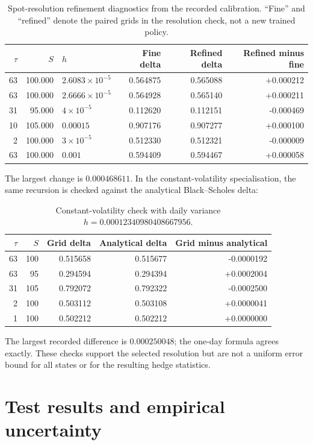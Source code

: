\documentclass[11pt,a4paper]{article}
\theoremstyle{remark}
\begin{document}
\begin{table}[htbp]
\centering\small
\caption{Spot-resolution refinement diagnostics from the recorded calibration. ``Fine'' and ``refined'' denote the paired grids in the resolution check, not a new trained policy.}
\label{tab:refinement}
\begin{tabular}{@{}rrlrrr@{}}
\toprule
$\tau$ & $S$ & $h$ & Fine delta & Refined delta & Refined minus fine\\
\midrule
63 & 100.000 & $2.6083\times 10^{-5}$ & 0.564875 & 0.565088 & +0.000212 \\
63 & 100.000 & $2.6666\times 10^{-5}$ & 0.564928 & 0.565140 & +0.000211 \\
31 & 95.000 & $4\times 10^{-5}$ & 0.112620 & 0.112151 & -0.000469 \\
10 & 105.000 & $0.00015$ & 0.907176 & 0.907277 & +0.000100 \\
2 & 100.000 & $3\times 10^{-5}$ & 0.512330 & 0.512321 & -0.000009 \\
63 & 100.000 & $0.001$ & 0.594409 & 0.594467 & +0.000058 \\
\bottomrule
\end{tabular}
\end{table}
The largest change is $0.000468611$. In the constant-volatility specialisation, the same recursion is checked against the analytical Black--Scholes delta:
\begin{table}[htbp]
\centering\small
\caption{Constant-volatility check with daily variance $h=0.00012340980408667956$.}
\begin{tabular}{@{}rrrrr@{}}
\toprule
$\tau$ & $S$ & Grid delta & Analytical delta & Grid minus analytical\\
\midrule
63 & 100 & 0.515658 & 0.515677 & -0.0000192 \\
63 & 95 & 0.294594 & 0.294394 & +0.0002004 \\
31 & 105 & 0.792072 & 0.792322 & -0.0002500 \\
2 & 100 & 0.503112 & 0.503108 & +0.0000041 \\
1 & 100 & 0.502212 & 0.502212 & +0.0000000 \\
\bottomrule
\end{tabular}
\end{table}
The largest recorded difference is $0.000250048$; the one-day formula agrees exactly. These checks support the selected resolution but are not a uniform error bound for all states or for the resulting hedge statistics.

\section{Test results and empirical uncertainty}
\end{document}
